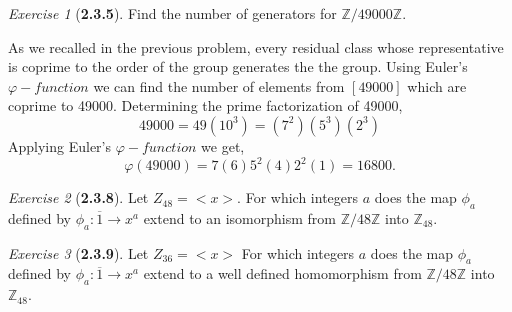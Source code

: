 \documentclass[12pt]{amsart}
\makeatletter
\theoremstyle{remark}
\newtheorem*{exercise}{Exercise}%
\def\ZZ{\ensuremath{\mathbb Z}}
\renewenvironment{proof}[1][\proofname]{\par\doublespacing
  \pushQED{\qed}%
  \normalfont \topsep6\p@\@plus6\p@\relax
  \list{}{%
    \settowidth{\leftmargin}{\itshape\proofname:\hskip\labelsep}%
    \setlength{\labelwidth}{0pt}%
    \setlength{\itemindent}{-\leftmargin}%
  }%
  \item[\hskip\labelsep\itshape#1\@addpunct{:}]\ignorespaces
}{%
  \popQED\endlist\@endpefalse
  \singlespacing
}
\theoremstyle{mycomment}
\makeatother
\begin{document}
\begin{exercise}[\textbf{2.3.5}] Find the number of generators for $\ZZ/49000\ZZ$.
  \begin{proof}[Solution] As we recalled in the previous problem, every residual class whose representative is coprime to the 
    order of the group generates the the group. Using Euler's $\varphi-function$ we can find the number of elements from $[49000]$ which 
    are coprime to 49000. Determining the prime factorization of 49000, 
    \begin{equation*}
      49000 = 49(10^3) = (7^2)(5^3)(2^3)
    \end{equation*}
    Applying Euler's $\varphi-function$ we get, 
    \begin{equation*}
      \varphi(49000) = 7(6)5^2(4)2^2(1) = 16800.
    \end{equation*}
    \end{proof}
\end{exercise}
\vspace{.15in}


\begin{exercise}[\textbf{2.3.8}] Let $Z_{48} = <x>$. For which integers $a$ does the map $\phi_a$ defined by $\phi_a :\overline{1} \to x^{a}$ extend to an 
  isomorphism from $\ZZ/48\ZZ$ into $\ZZ_{48}$.
  \begin{proof} 
    \end{proof}
\end{exercise}
\vspace{.15in}

\begin{exercise}[\textbf{2.3.9}] Let $Z_{36} = <x>$ For which integers $a$ does the map $\phi_a$ defined by $\phi_a :\overline{1} \to x^{a}$ extend to a 
  well defined homomorphism from $\ZZ/48\ZZ$ into $\ZZ_{48}$.
  \begin{proof} 
    \end{proof}
\end{exercise}
\vspace{.15in}
\end{document}
